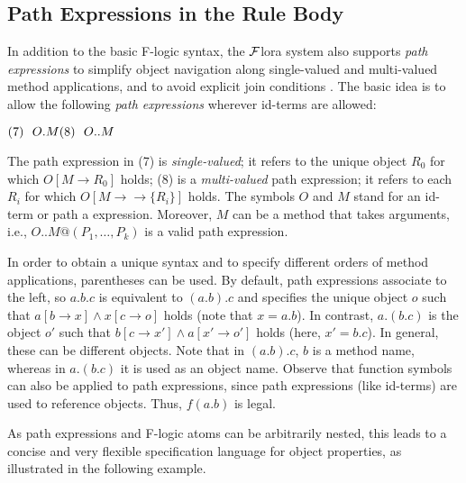 \documentclass[11pt]{article}
\newcommand{\fd}{\ensuremath{{\rightarrow}}}                   %
\newcommand{\mvd}{\ensuremath{{\rightarrow\!\!\!\!\rightarrow}}}  %
\newcommand{\FLORA}{{\mbox{${\cal F}${\sc lora}}}\xspace}
\newcommand{\fl}{{F-logic}\xspace}
\begin{document}
\subsection{Path Expressions in the Rule Body}

In addition to the basic \fl syntax, the \FLORA  system also supports
\emph{path expressions} to simplify object navigation along
single-valued and multi-valued method applications, and to avoid
explicit join conditions \cite{frohn-lausen-uphoff-VLDB-94}.  The
basic idea is to allow the following \emph{path expressions} wherever
id-terms are allowed:

  \medskip

\begin{math}
  \hfill (7)~~O.M \hfill (8)~~O..M \hfill
\end{math} \medskip

\noindent
The path expression in (7) is \emph{single-valued}; it refers to the unique
object $R_0$ for which $O[M\fd R_0]$ holds; (8) is a \emph{multi-valued}
path expression; it refers to each $R_i$ for which $O[M\mvd\{R_i\}]$ holds.
The symbols $O$ and $M$ stand for an id-term or path a expression.
Moreover, $M$ can be a method that takes arguments, i.e.,
$O..M@(P_1,\dots,P_k)$ is a valid path expression.
  
In order to obtain a unique syntax and to specify different orders of
method applications, parentheses can be used. By default, path expressions
associate to the left, so $a.b.c$ is equivalent to $(a.b).c$ and specifies
the unique object $o$ such that $a[b\fd x] \land x[c\fd o]$ holds (note
that $x=a.b$). In contrast, $a.(b.c)$ is the object $o'$ such that $b[c\fd
x'] \land a[x'\fd o']$ holds (here, $x'=b.c$). In general, these can be
different objects. Note that in $(a.b).c$, $b$ is a method name, whereas in
$a.(b.c)$ it is used as an object name.  Observe that function symbols can
also be applied to path expressions, since path expressions (like id-terms)
are used to reference objects. Thus, $f(a.b)$ is legal.
  
As path expressions and \fl atoms can be arbitrarily nested, this leads
to a concise and very flexible specification language for object
properties, as illustrated in the following example.
\end{document}
